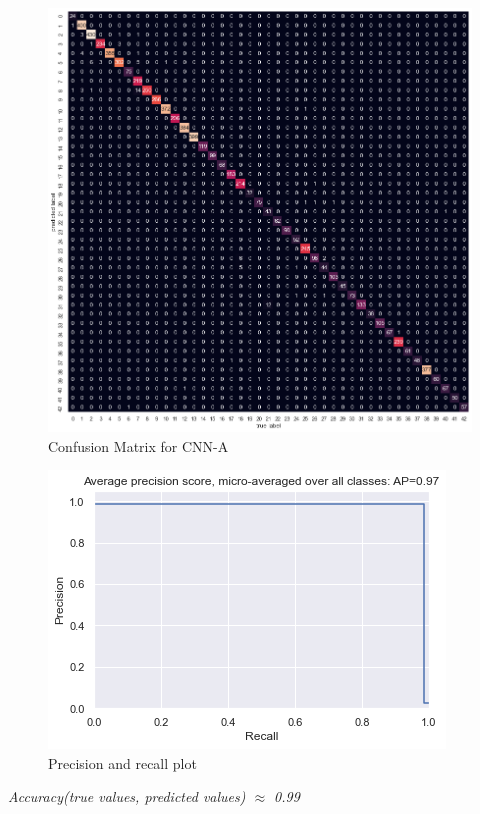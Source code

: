 \documentclass[12pt, landscape]{article}
\begin{document}
\begin{multicols}{3}
\begin{figure}[H]
    \centerline{\includegraphics[scale = 0.4]{confmat.png}}
    \caption{Confusion Matrix for CNN-A}
    \label{fig:CNNAconusionmatrix}
\end{figure}
\begin{figure}[H]
    \centerline{\includegraphics[scale = 0.6]{precisionrecall.png}}
    \caption{Precision and recall plot}
    \label{fig:CNNAprecrec}
\end{figure}

\begin{center}
\emph{Accuracy(true values, predicted values) $\approx$ 0.99}


\end{center}
\end{multicols}
\end{document}
